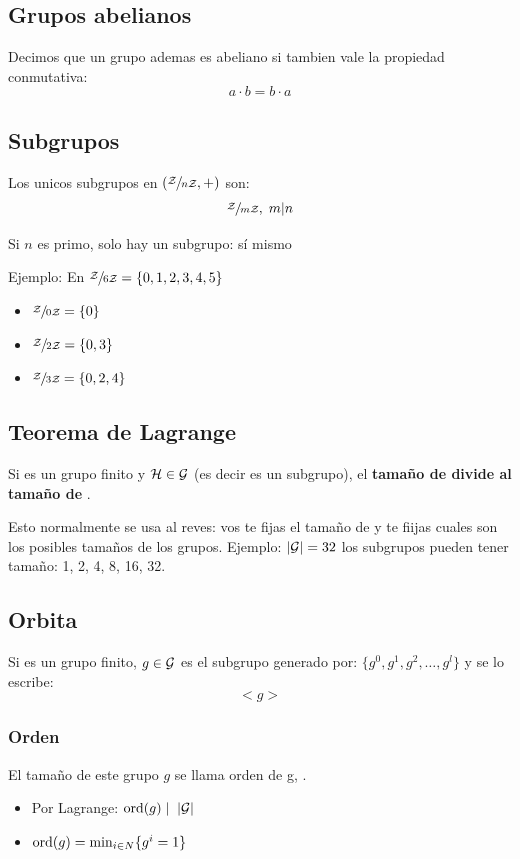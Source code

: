 \documentclass[12pt,a4paper]{report}
\begin{document}
\subsection{Grupos abelianos}
Decimos que un grupo ademas es abeliano si tambien vale la propiedad conmutativa:
$$
a \cdot b = b \cdot a
$$

\subsection{Subgrupos}
\label{sec:subgrupos}


Los unicos subgrupos en $(\cuerpo, +)$ son:
$$
\cuerpo[m], \; m | n
$$

Si $n$ es primo, solo hay un subgrupo: sí mismo

Ejemplo: En $\cuerpo[6] = \{ 0, 1, 2, 3, 4, 5 \}$
\begin{itemize}
\item $\cuerpo[0] = \{0 \}$
\item $\cuerpo[2] = \{0, 3 \}$
\item $\cuerpo[3] = \{0, 2, 4 \}$
\end{itemize}

\subsection{Teorema de Lagrange}
\label{sec:teorema-langrange}

Si  es un grupo finito y $\li{H} \in \li{G}$  (es decir es un subgrupo), el \textbf{tamaño de  divide al tamaño de }.

Esto normalmente se usa al reves: vos te fijas el tamaño de  y te fiijas cuales son los posibles tamaños de los grupos. Ejemplo: $|\li{G}| = 32$ los subgrupos pueden tener tamaño: 1, 2, 4, 8, 16, 32.

\subsection{Orbita}
\label{sec:orbita}

Si  es un grupo finito, $g \in \li{G}$ es el subgrupo generado por: $\{g^0, g^1, g^2, \dots, g^l\}$ y se lo escribe:
$$
<g>
$$

\subsubsection{Orden}
El tamaño de este grupo $g$ se llama orden de g, .
\begin{itemize}
\item Por Lagrange: $\orden{g} \; | \; \; |\li{G}|$
\item $\orden{g} = \min_{i \in N} \{ g^i = 1 \}$
\end{itemize}
\end{document}
